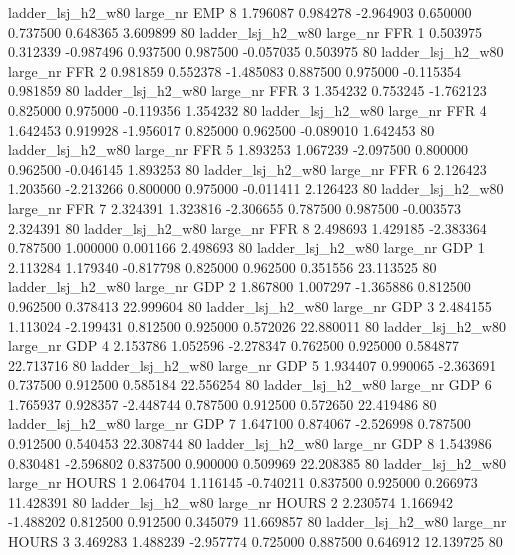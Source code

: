   ladder_lsj_h2_w80   large_nr      EMP                 8  1.796087  0.984278  -2.964903 0.650000 0.737500  0.648365    3.609899 80
  ladder_lsj_h2_w80   large_nr      FFR                 1  0.503975  0.312339  -0.987496 0.937500 0.987500 -0.057035    0.503975 80
  ladder_lsj_h2_w80   large_nr      FFR                 2  0.981859  0.552378  -1.485083 0.887500 0.975000 -0.115354    0.981859 80
  ladder_lsj_h2_w80   large_nr      FFR                 3  1.354232  0.753245  -1.762123 0.825000 0.975000 -0.119356    1.354232 80
  ladder_lsj_h2_w80   large_nr      FFR                 4  1.642453  0.919928  -1.956017 0.825000 0.962500 -0.089010    1.642453 80
  ladder_lsj_h2_w80   large_nr      FFR                 5  1.893253  1.067239  -2.097500 0.800000 0.962500 -0.046145    1.893253 80
  ladder_lsj_h2_w80   large_nr      FFR                 6  2.126423  1.203560  -2.213266 0.800000 0.975000 -0.011411    2.126423 80
  ladder_lsj_h2_w80   large_nr      FFR                 7  2.324391  1.323816  -2.306655 0.787500 0.987500 -0.003573    2.324391 80
  ladder_lsj_h2_w80   large_nr      FFR                 8  2.498693  1.429185  -2.383364 0.787500 1.000000  0.001166    2.498693 80
  ladder_lsj_h2_w80   large_nr      GDP                 1  2.113284  1.179340  -0.817798 0.825000 0.962500  0.351556   23.113525 80
  ladder_lsj_h2_w80   large_nr      GDP                 2  1.867800  1.007297  -1.365886 0.812500 0.962500  0.378413   22.999604 80
  ladder_lsj_h2_w80   large_nr      GDP                 3  2.484155  1.113024  -2.199431 0.812500 0.925000  0.572026   22.880011 80
  ladder_lsj_h2_w80   large_nr      GDP                 4  2.153786  1.052596  -2.278347 0.762500 0.925000  0.584877   22.713716 80
  ladder_lsj_h2_w80   large_nr      GDP                 5  1.934407  0.990065  -2.363691 0.737500 0.912500  0.585184   22.556254 80
  ladder_lsj_h2_w80   large_nr      GDP                 6  1.765937  0.928357  -2.448744 0.787500 0.912500  0.572650   22.419486 80
  ladder_lsj_h2_w80   large_nr      GDP                 7  1.647100  0.874067  -2.526998 0.787500 0.912500  0.540453   22.308744 80
  ladder_lsj_h2_w80   large_nr      GDP                 8  1.543986  0.830481  -2.596802 0.837500 0.900000  0.509969   22.208385 80
  ladder_lsj_h2_w80   large_nr    HOURS                 1  2.064704  1.116145  -0.740211 0.837500 0.925000  0.266973   11.428391 80
  ladder_lsj_h2_w80   large_nr    HOURS                 2  2.230574  1.166942  -1.488202 0.812500 0.912500  0.345079   11.669857 80
  ladder_lsj_h2_w80   large_nr    HOURS                 3  3.469283  1.488239  -2.957774 0.725000 0.887500  0.646912   12.139725 80

